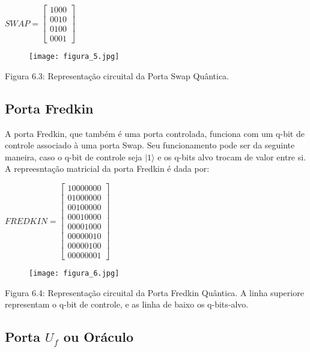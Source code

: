 \documentclass[12pt, a4paper, oneside]{article}
\begin{document}
\begin{center}
$
SWAP = \left[
\begin{array}{cccc}
1 0 0 0 \\
0 0 1 0 \\
0 1 0 0 \\
0 0 0 1 
\end{array}
\right]
$
\end{center}
\newpage

\begin{figure}
\centering 
\texttt{[image: figura\_5.jpg]} 
\end{figure}

\noindent Figura 6.3: Representação circuital da Porta Swap Quântica.\\

\subsection{Porta Fredkin}

\par A porta Fredkin, que também é uma porta controlada, funciona com um q-bit de controle
associado à uma porta Swap. Seu funcionamento pode ser da seguinte maneira, caso o q-bit
de controle seja $| 1 \rangle$ e os q-bits alvo trocam de valor entre si.\\
A repreesntação matricial da porta Fredkin é dada por:\\
\begin{center}
$
FREDKIN = \left[
\begin{array}{cccccccc}
1 0 0 0 0 0 0 0\\
0 1 0 0 0 0 0 0\\
0 0 1 0 0 0 0 0\\
0 0 0 1 0 0 0 0\\
0 0 0 0 1 0 0 0\\
0 0 0 0 0 0 1 0\\
0 0 0 0 0 1 0 0\\
0 0 0 0 0 0 0 1
\end{array}
\right]
$
\end{center}
\newpage
\begin{figure}
\centering 
\texttt{[image: figura\_6.jpg]} 
\end{figure}

\noindent Figura 6.4: Representação circuital da Porta Fredkin Quântica. A linha superiore representam o
q-bit de controle, e as linha de baixo os q-bits-alvo.

\subsection{Porta $U_f$ ou Oráculo}
\end{document}
